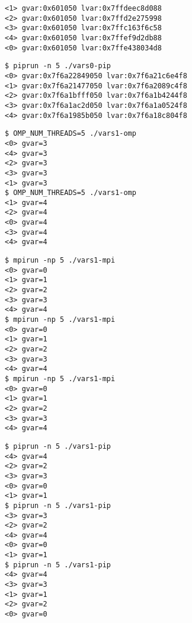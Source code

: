 
\begin{lstlisting}[style=example,caption={``Vars0 MPI'' output},label=out:vars0-mpi]
<1> gvar:0x601050 lvar:0x7ffdeec8d088
<2> gvar:0x601050 lvar:0x7ffd2e275998
<3> gvar:0x601050 lvar:0x7ffc163f6c58
<4> gvar:0x601050 lvar:0x7ffef9d2db88
<0> gvar:0x601050 lvar:0x7ffe438034d8
\end{lstlisting}


\begin{lstlisting}[style=example,caption={``Vars0 PiP'' output},label=out:vars0-pip]
$ piprun -n 5 ./vars0-pip
<0> gvar:0x7f6a22849050 lvar:0x7f6a21c6e4f8
<1> gvar:0x7f6a21477050 lvar:0x7f6a2089c4f8
<2> gvar:0x7f6a1bfff050 lvar:0x7f6a1b4244f8
<3> gvar:0x7f6a1ac2d050 lvar:0x7f6a1a0524f8
<4> gvar:0x7f6a1985b050 lvar:0x7f6a18c804f8
\end{lstlisting}




\begin{lstlisting}[style=example,caption={``Vars1 OMP'' output},label=out:vars1-omp]
$ OMP_NUM_THREADS=5 ./vars1-omp
<0> gvar=3
<4> gvar=3
<2> gvar=3
<3> gvar=3
<1> gvar=3
$ OMP_NUM_THREADS=5 ./vars1-omp
<1> gvar=4
<2> gvar=4
<0> gvar=4
<3> gvar=4
<4> gvar=4
\end{lstlisting}


\begin{lstlisting}[style=example,caption={``Vars1 MPI'' output},label=out:vars1-mpi]
$ mpirun -np 5 ./vars1-mpi
<0> gvar=0
<1> gvar=1
<2> gvar=2
<3> gvar=3
<4> gvar=4
$ mpirun -np 5 ./vars1-mpi
<0> gvar=0
<1> gvar=1
<2> gvar=2
<3> gvar=3
<4> gvar=4
$ mpirun -np 5 ./vars1-mpi
<0> gvar=0
<1> gvar=1
<2> gvar=2
<3> gvar=3
<4> gvar=4
\end{lstlisting}


\begin{lstlisting}[style=example,caption={``Vars1 PiP'' output},label=out:vars1-pip]
$ piprun -n 5 ./vars1-pip
<4> gvar=4
<2> gvar=2
<3> gvar=3
<0> gvar=0
<1> gvar=1
$ piprun -n 5 ./vars1-pip
<3> gvar=3
<2> gvar=2
<4> gvar=4
<0> gvar=0
<1> gvar=1
$ piprun -n 5 ./vars1-pip
<4> gvar=4
<3> gvar=3
<1> gvar=1
<2> gvar=2
<0> gvar=0
\end{lstlisting}

